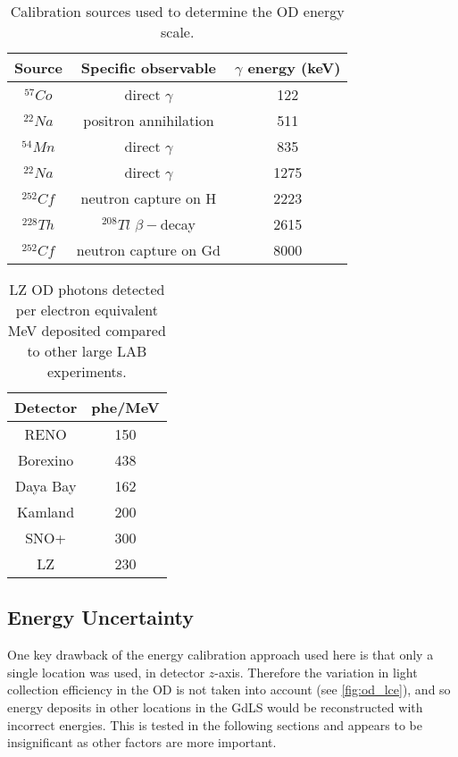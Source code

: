 \begin{table}[]%
    \centering
    \begin{tabular}{c|c|c}
        Source      & Specific observable         &  $\gamma$ energy (keV) \\ \hline
        ${}^{57}Co$ & direct $\gamma$             & 122                        \\
        ${}^{22}Na$ & positron annihilation       & 511               \\
        ${}^{54}Mn$ & direct $\gamma$             & 835                        \\
        ${}^{22}Na$ & direct $\gamma$             & 1275               \\
        ${}^{252}Cf$ & neutron capture on H       & 2223            \\
        ${}^{228}Th$ & ${}^{208}Tl$ $\beta-$decay & 2615            \\
        ${}^{252}Cf$ & neutron capture on Gd      & 8000            
        
    \end{tabular}
    \caption{Calibration sources used to determine the OD energy scale.}
    \label{tab:od_energy_calibration_sources}
\end{table}



\begin{table}[]%
    \centering
    \begin{tabular}{c|c}
        Detector & phe/MeV \\ \hline
        RENO     & 150 \cite{reno_phe_per_mev_ref} \\
        Borexino & 438 \cite{pablo_mosteiro_thesis_ref} \\
        Daya Bay & 162 \cite{dayabay_phe_per_mev_ref} \\
        Kamland  & 200 \cite{kamland_phe_per_mev_ref} \\
        SNO+     & 300 \cite{snoplus_phe_per_mev_ref} \\
        LZ       & 230 
    \end{tabular}
    \caption{LZ OD photons detected per electron equivalent MeV deposited compared to other large LAB experiments.}
    \label{tab:od_phe_per_mev_comparison}
\end{table}

\subsection{Energy Uncertainty}
\par
One key drawback of the energy calibration approach used here is that only a single location was used, in detector $z$-axis.
Therefore the variation in light collection efficiency in the OD is not taken into account (see \autoref{fig:od_lce}), and so energy deposits in other locations in the GdLS would be reconstructed with incorrect energies.
This is tested in the following sections and appears to be insignificant as other factors are more important.


